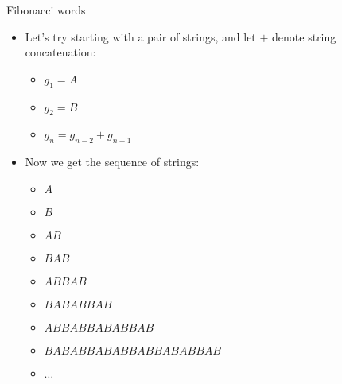 \documentclass[12pt,t]{beamer}
\newcommand{\bi}{\begin{itemize}}
\newcommand{\ei}{\end{itemize}}
\begin{document}
\begin{frame}{Fibonacci words}
    \vspace{10pt}
    \bi
        \item Let's try starting with a pair of strings, and let $+$ denote string concatenation:
            \bi
                \item $g_1 = A$
                \item $g_2 = B$
                \item $g_n = g_{n-2} + g_{n-1}$
            \ei
        \vspace{10pt}
        \item Now we get the sequence of strings:
            \bi
                \item $A$
                \item $B$
                \item $AB$
                \item $BAB$
                \item $ABBAB$
                \item $BABABBAB$
                \item $ABBABBABABBAB$
                \item $BABABBABABBABBABABBAB$
                \item $\ldots$
            \ei
    \ei
\end{frame}
\end{document}
